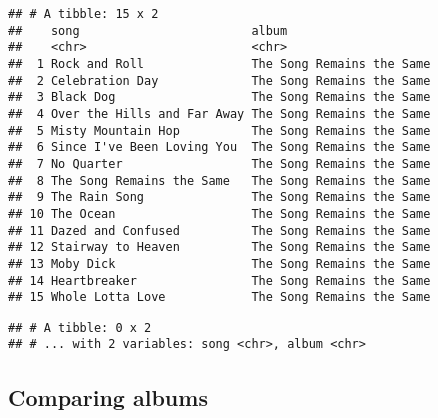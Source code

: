\documentclass[]{article}
\newenvironment{Shaded}{\begin{snugshade}}{\end{snugshade}}
\newcommand{\KeywordTok}[1]{\textcolor[rgb]{0.13,0.29,0.53}{\textbf{#1}}}
\newcommand{\DataTypeTok}[1]{\textcolor[rgb]{0.13,0.29,0.53}{#1}}
\newcommand{\StringTok}[1]{\textcolor[rgb]{0.31,0.60,0.02}{#1}}
\newcommand{\CommentTok}[1]{\textcolor[rgb]{0.56,0.35,0.01}{\textit{#1}}}
\newcommand{\OperatorTok}[1]{\textcolor[rgb]{0.81,0.36,0.00}{\textbf{#1}}}
\newcommand{\NormalTok}[1]{#1}
\begin{document}
\begin{Shaded}
\end{Shaded}

\begin{verbatim}
## # A tibble: 15 x 2
##    song                        album                    
##    <chr>                       <chr>                    
##  1 Rock and Roll               The Song Remains the Same
##  2 Celebration Day             The Song Remains the Same
##  3 Black Dog                   The Song Remains the Same
##  4 Over the Hills and Far Away The Song Remains the Same
##  5 Misty Mountain Hop          The Song Remains the Same
##  6 Since I've Been Loving You  The Song Remains the Same
##  7 No Quarter                  The Song Remains the Same
##  8 The Song Remains the Same   The Song Remains the Same
##  9 The Rain Song               The Song Remains the Same
## 10 The Ocean                   The Song Remains the Same
## 11 Dazed and Confused          The Song Remains the Same
## 12 Stairway to Heaven          The Song Remains the Same
## 13 Moby Dick                   The Song Remains the Same
## 14 Heartbreaker                The Song Remains the Same
## 15 Whole Lotta Love            The Song Remains the Same
\end{verbatim}

\begin{Shaded}
\end{Shaded}

\begin{verbatim}
## # A tibble: 0 x 2
## # ... with 2 variables: song <chr>, album <chr>
\end{verbatim}

\subsection{Comparing albums}\label{comparing-albums}
\end{document}

